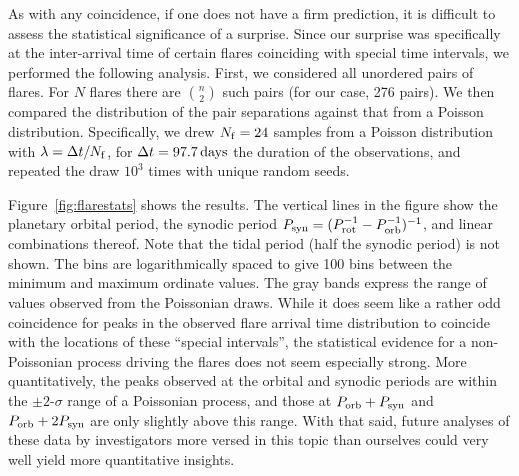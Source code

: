 \documentclass[12pt,modern,twocolumn,tighten]{aastex63}
\begin{document}
As with any coincidence, if one does not have a firm prediction, it is
difficult to assess the statistical significance of a surprise.  Since
our surprise was specifically at the inter-arrival time of certain
flares coinciding with special time intervals, we performed the
following analysis.  First, we considered all unordered pairs of
flares.  For $N$ flares there are ${n \choose 2}$ such pairs (for our
case, 276 pairs).  We then compared the distribution of the pair
separations against that from a Poisson distribution.  Specifically,
we drew $N_{\rm f}=24$ samples from a Poisson distribution with
$\lambda = \Delta t / N_{\rm f}$, for $\Delta t=97.7\,{\rm days}$ the
duration of the observations, and repeated the draw $10^3$ times with
unique random seeds.

Figure~\ref{fig:flarestats} shows the results.  The vertical lines in
the figure show the planetary orbital period, the synodic period
$P_{\rm syn} = (P_{\rm rot}^{-1} - P_{\rm orb}^{-1})^{-1}$, and linear
combinations thereof.  Note that the tidal period (half the synodic
period) is not shown.  The bins are logarithmically spaced to give 100
bins between the minimum and maximum ordinate values.  The gray bands
express the range of values observed from the Poissonian draws.  While
it does seem like a rather odd coincidence for peaks in the observed
flare arrival time distribution to coincide with the locations of
these ``special intervals'', the statistical evidence for a
non-Poissonian process driving the flares does not seem especially
strong.  More quantitatively, the peaks observed at the orbital and
synodic periods are within the $\pm 2$-$\sigma$ range of a Poissonian
process, and those at $P_{\rm orb}+P_{\rm syn}$ and $P_{\rm
orb}+2P_{\rm syn}$ are only slightly above this range.  With that
said, future analyses of these data by investigators more versed in
this topic than ourselves could very well yield more quantitative insights.



\listofchanges

\end{document}
